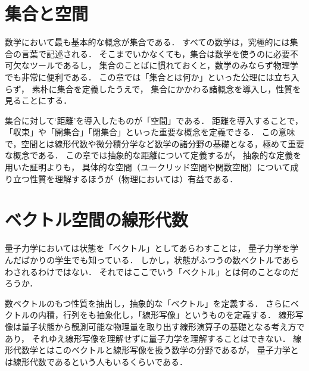 \documentclass{sotsu}
\begin{document}
\tableofcontents


\chapter{集合と空間}
\label{sec:set-and-space}

数学において最も基本的な概念が集合である．
すべての数学は，究極的には集合の言葉で記述される．
そこまでいかなくても，集合は数学を使うのに必要不可欠なツールであるし，
集合のことばに慣れておくと，数学のみならず物理学でも非常に便利である．
この章では「集合とは何か」といった公理には立ち入らず，
素朴に集合を定義したうえで，
集合にかかわる諸概念を導入し，性質を見ることにする．

集合に対して`距離'を導入したものが「空間」である．
距離を導入することで，「収束」や「開集合」「閉集合」といった重要な概念を定義できる．
この意味で，空間とは線形代数や微分積分学など数学の諸分野の基礎となる，極めて重要な概念である．
この章では抽象的な距離について定義するが，
抽象的な定義を用いた証明よりも，
具体的な空間（ユークリッド空間や関数空間）について成り立つ性質を理解するほうが（物理においては）有益である．










\chapter{ベクトル空間の線形代数}
\label{sec:linear-algebra}

量子力学においては状態を「ベクトル」としてあらわすことは，
量子力学を学んだばかりの学生でも知っている．
しかし，状態がふつうの数ベクトルであらわされるわけではない．
それではここでいう「ベクトル」とは何のことなのだろうか．

数ベクトルのもつ性質を抽出し，抽象的な「ベクトル」を定義する．
さらにベクトルの内積，行列をも抽象化し，「線形写像」というものを定義する．
線形写像は量子状態から観測可能な物理量を取り出す線形演算子の基礎となる考え方であり，
それゆえ線形写像を理解せずに量子力学を理解することはできない．
線形代数学とはこのベクトルと線形写像を扱う数学の分野であるが，
量子力学とは線形代数であるという人もいるくらいである．







\end{document}
